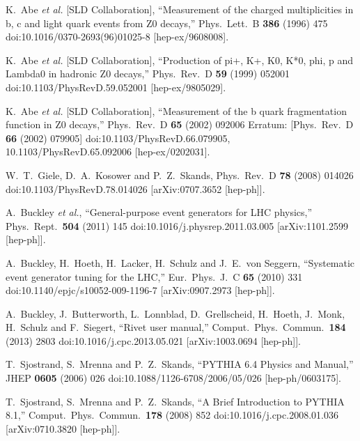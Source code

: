 \documentclass[aps,preprint,floatfix,nofootinbib,showpacs]{revtex4-1}
\begin{document}
\begin{thebibliography}{99}
  K.~Abe {\it et al.} [SLD Collaboration],
  ``Measurement of the charged multiplicities in b, c and light quark events from Z0 decays,''
  Phys.\ Lett.\ B {\bf 386} (1996) 475
  doi:10.1016/0370-2693(96)01025-8
  [hep-ex/9608008].
  
  K.~Abe {\it et al.} [SLD Collaboration],
  ``Production of pi+, K+, K0, K*0, phi, p and Lambda0 in hadronic Z0 decays,''
  Phys.\ Rev.\ D {\bf 59} (1999) 052001
  doi:10.1103/PhysRevD.59.052001
  [hep-ex/9805029].
  
  K.~Abe {\it et al.} [SLD Collaboration],
  ``Measurement of the b quark fragmentation function in Z0 decays,''
  Phys.\ Rev.\ D {\bf 65} (2002) 092006
   Erratum: [Phys.\ Rev.\ D {\bf 66} (2002) 079905]
  doi:10.1103/PhysRevD.66.079905, 10.1103/PhysRevD.65.092006
  [hep-ex/0202031].
  
  W.~T.~Giele, D.~A.~Kosower and P.~Z.~Skands,
  Phys.\ Rev.\ D {\bf 78} (2008) 014026
  doi:10.1103/PhysRevD.78.014026
  [arXiv:0707.3652 [hep-ph]].
  
  A.~Buckley {\it et al.},
  ``General-purpose event generators for LHC physics,''
  Phys.\ Rept.\  {\bf 504} (2011) 145
  doi:10.1016/j.physrep.2011.03.005
  [arXiv:1101.2599 [hep-ph]].
  
  A.~Buckley, H.~Hoeth, H.~Lacker, H.~Schulz and J.~E.~von Seggern,
  ``Systematic event generator tuning for the LHC,''
  Eur.\ Phys.\ J.\ C {\bf 65} (2010) 331
  doi:10.1140/epjc/s10052-009-1196-7
  [arXiv:0907.2973 [hep-ph]].
  
  A.~Buckley, J.~Butterworth, L.~Lonnblad, D.~Grellscheid, H.~Hoeth, J.~Monk, H.~Schulz and F.~Siegert,
  ``Rivet user manual,''
  Comput.\ Phys.\ Commun.\  {\bf 184} (2013) 2803
  doi:10.1016/j.cpc.2013.05.021
  [arXiv:1003.0694 [hep-ph]].
  
  T.~Sjostrand, S.~Mrenna and P.~Z.~Skands,
  ``PYTHIA 6.4 Physics and Manual,''
  JHEP {\bf 0605} (2006) 026
  doi:10.1088/1126-6708/2006/05/026
  [hep-ph/0603175].
  
  T.~Sjostrand, S.~Mrenna and P.~Z.~Skands,
  ``A Brief Introduction to PYTHIA 8.1,''
  Comput.\ Phys.\ Commun.\  {\bf 178} (2008) 852
  doi:10.1016/j.cpc.2008.01.036
  [arXiv:0710.3820 [hep-ph]].
  

\end{thebibliography}
\end{document}
